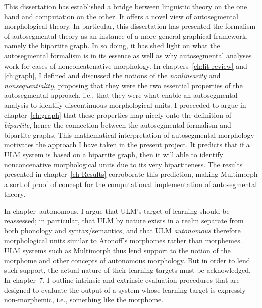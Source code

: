 This dissertation has established a bridge between linguistic theory 
on the one hand and computation on the other. 
It offers a novel view of autosegmental morphological theory. 
In particular, this dissertation has presented the formalism of autosegmental theory
as an instance of a more general graphical framework, namely 
the bipartite graph. In so doing, it has shed light on what the autosegmental formalism is in 
its essence as well as why autosegmental analyses work for 
cases of nonconcatenative morphology. In chapters~\ref{ch:lit-review} and \ref{ch:graph}, I
defined and discussed the notions of the \emph{nonlinearity} and \emph{nonsequentiality}, 
proposing that they were the two essential properties of the autosegmental approach, 
i.e., that they were what enable an autosegmental
analysis to identify discontinuous morphological units. I proceeded to 
argue in chapter~\ref{ch:graph} that these
properties map nicely onto the definition of \emph{bipartite}, 
hence the connection between the autosegmental formalism and bipartite graphs.
This mathematical interpretation of autosegmental morphology 
motivates the approach I have taken in the present project. 
It predicts that if a ULM system is based on a bipartite graph, then 
it will able to identify nonconcenative morphological
units due to its very bipartiteness. The results presented in chapter~\ref{ch-Results} 
 corroborate this prediction, making 
 Multimorph a sort of proof of concept for the 
 computational implementation of autosegmental 
 theory.

In chapter~{autonomous}, I argue that ULM's target of learning should be reassessed; in particular, that ULM by nature
exists in a realm separate from both phonology and syntax/semantics, and that ULM \emph{autonomous} therefore morphological units similar to Aronoff's morphomes \citep{aronoff:1994} rather than morphemes. ULM systems such as 
Multimorph thus lend support to the notion of the morphome and other concepts of autonomous 
morphology. But in order to lend such support, the actual nature of their learning targets must 
be acknowledged. In chapter~7, I outline intrinsic and extrinsic evaluation procedures that are 
designed to evaluate the output of a system whose learning target is expressly 
non-morphemic, i.e., something like the morphome.


